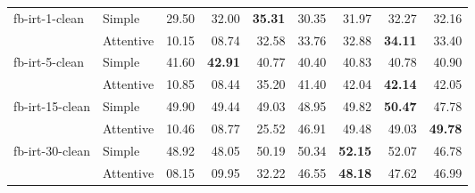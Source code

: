 \begin{tabular}{| l | l | r | r | r | r | r | r | r |}
    \multirow{2}{*}{fb-irt-1-clean}
    & Simple    & 29.50 & 32.00 & \textbf{35.31} & 30.35 & 31.97 & 32.27 & 32.16 \\
    & Attentive & 10.15 & 08.74 & 32.58 & 33.76 & 32.88 & \textbf{34.11} & 33.40 \\ \hline

    \multirow{2}{*}{fb-irt-5-clean}
    & Simple    & 41.60 & \textbf{42.91} & 40.77 & 40.40 & 40.83 & 40.78 & 40.90 \\
    & Attentive & 10.85 & 08.44 & 35.20 & 41.40 & 42.04 & \textbf{42.14} & 42.05 \\ \hline

    \multirow{2}{*}{fb-irt-15-clean}
    & Simple    & 49.90 & 49.44 & 49.03 & 48.95 & 49.82 & \textbf{50.47} & 47.78 \\
    & Attentive & 10.46 & 08.77 & 25.52 & 46.91 & 49.48 & 49.03 & \textbf{49.78} \\ \hline

    \multirow{2}{*}{fb-irt-30-clean}
    & Simple    & 48.92 & 48.05 & 50.19 & 50.34 & \textbf{52.15} & 52.07 & 46.78 \\
    & Attentive & 08.15 & 09.95 & 32.22 & 46.55 & \textbf{48.18} & 47.62 & 46.99 \\ \hline

\end{tabular}
